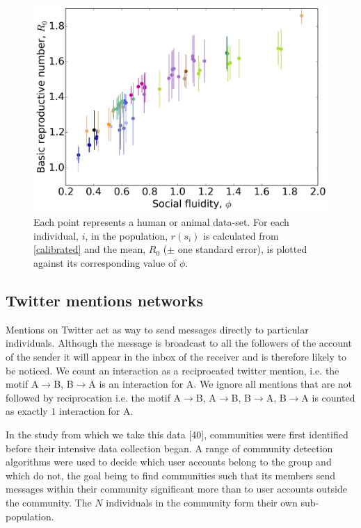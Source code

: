 \documentclass[twocolumn,8pt]{article}
\begin{document}
\begin{figure}[t]
\centering
\includegraphics[width=\linewidth]{Figures/all_R0_theory.png}
\caption{Each point represents a human or animal data-set. For each individual, $i$, in the population,  $r(s_{i})$ is calculated from \eqref{calibrated} and the mean, $R_{0}$ ($\pm$ one standard error), is plotted against its corresponding value of $\phi$.}
\label{disease_theory}
\end{figure}

\subsection{Twitter mentions networks}
Mentions on Twitter act as way to send messages directly to particular individuals. Although the message is broadcast to all the followers of the  account of the sender it will appear in the inbox of the receiver and is therefore likely to be noticed. We count an interaction as a reciprocated twitter mention, i.e. the motif A$\rightarrow$B, B$\rightarrow$A is an  interaction for A. We ignore all mentions that are not followed by reciprocation i.e. the motif A$\rightarrow$B, A$\rightarrow$B, B$\rightarrow$A, B$\rightarrow$A is counted as exactly $1$ interaction for A.

In the study from which we take this data [40], communities were first identified before their intensive data collection began. A range of community detection algorithms were used to decide which user accounts belong to the group and which do not, the goal being to find communities such that its members send messages within their community significant more than to user accounts outside the community. The $N$ individuals in the community form their own sub-population. 
\end{document}
